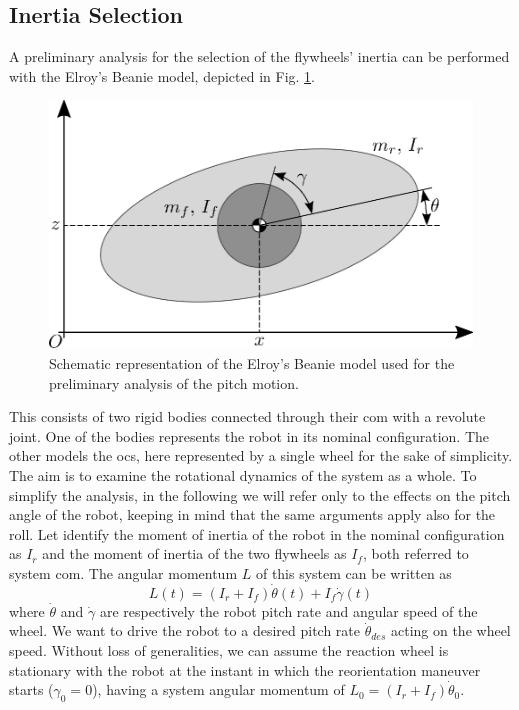 \documentclass[journal,letterpaper]{IEEEtran}
\begin{document}
\subsection{Inertia Selection}
A preliminary analysis for the selection of the flywheels' inertia can be performed with the Elroy's Beanie model, depicted in Fig. \ref{fig:elroy-beanie}.
\begin{figure}
	\centering
	\includegraphics[width=.7\linewidth]{figures/elroys-beanie.eps}
	\caption{Schematic representation of the Elroy's Beanie model used for the preliminary analysis of the pitch motion.}
	\label{fig:elroy-beanie}
\end{figure} 
This consists of two rigid bodies connected through their \acrshort{com} with a revolute joint. One of the bodies represents the robot in its nominal configuration. The other models the \acrshort{ocs}, here represented by a single wheel for the sake of simplicity. The aim is to examine the rotational dynamics of the system as a whole. To simplify the analysis, in the following we will refer only to the effects on the pitch angle of the robot, keeping in mind that the same arguments apply also for the roll. Let identify the moment of inertia of the robot in the nominal configuration as $I_r$ and the moment of inertia of the two flywheels as $I_f$, both referred to system \acrshort{com}.
The angular momentum $L$ of this system can be written as
\begin{equation}\label{eq:ang_mom_elroy}
L(t) = \left(I_r + I_{f}\right)\dot{\theta}(t) + I_{f}\dot{\gamma}(t)
\end{equation}
where $\dot{\theta}$ and $\dot{\gamma}$ are respectively the robot pitch rate and angular speed of the wheel. We want to drive the robot to a desired pitch rate $\dot{\theta}_{des}$ acting on the wheel speed.
Without loss of generalities, we can assume the reaction wheel is stationary with the robot at the instant in which the reorientation maneuver starts ($\gamma_0 = 0$), having a system angular momentum of $L_0 = \left(I_r + I_{f}\right)\dot{\theta}_0$.
\end{document}
